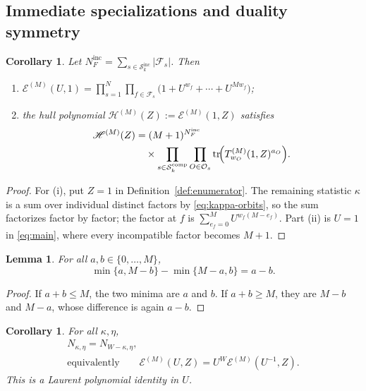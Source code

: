 \documentclass[preprint,12pt,a4paper]{elsarticle}
\newcommand{\Fs}{\mathcal F_s}
\newcommand{\Os}{\mathcal O_s}
\newcommand{\Epoly}{\mathscr E}
\newtheorem{lemma}[theorem]{Lemma}
\newtheorem{corollary}[theorem]{Corollary}
\theoremstyle{definition}
\theoremstyle{remark}
\begin{document}
\subsection{Immediate specializations and duality symmetry}
\label{sec:specialisations}

\begin{corollary}\label{cor:marginals}
Let $N_F^{\mathrm{inc}}=\sum_{s\in\mathcal{S}_k^{\mathrm{inc}}}|\Fs|$.  Then
\begin{enumerate}
\item[\textup{(i)}]
$\displaystyle
\Epoly^{(M)}(U,1)
 =\prod_{s=1}^{N}\prod_{f\in\Fs}
   \bigl(1+U^{w_f}+\cdots+U^{Mw_f}\bigr)$;
\item[\textup{(ii)}] the hull polynomial
$\mathscr{H}^{(M)}(Z):=\Epoly^{(M)}(1,Z)$ satisfies
\[
\begin{aligned}
\mathscr{H}^{(M)}(Z)
&=(M+1)^{N_F^{\mathrm{inc}}}\\
&\quad\times
\prod_{s\in\mathcal{S}_k^{\mathrm{comp}}}
\prod_{O\in\Os}
\operatorname{tr}\!\Bigl(
T^{(M)}_{w_O}(1,Z)^{a_O}
\Bigr).
\end{aligned}
\]
\end{enumerate}
\end{corollary}

\begin{proof}
For (i), put $Z=1$ in Definition~\ref{def:enumerator}.  The remaining statistic
$\kappa$ is a sum over individual distinct factors by
\eqref{eq:kappa-orbits}, so the sum factorizes factor by factor; the factor at
$f$ is $\sum_{e_f=0}^{M}U^{w_f(M-e_f)}$.  Part (ii) is $U=1$ in
\eqref{eq:main}, where every incompatible factor becomes $M+1$.
\end{proof}

\begin{lemma}\label{lem:telescoping}
For all $a,b\in\{0,\ldots,M\}$,
\[
\min\{a,M-b\}-\min\{M-a,b\}=a-b.
\]
\end{lemma}

\begin{proof}
If $a+b\leq M$, the two minima are $a$ and $b$.  If $a+b\geq M$, they are
$M-b$ and $M-a$, whose difference is again $a-b$.
\end{proof}

\begin{corollary}\label{cor:symmetry}
For all $\kappa,\eta$,
\[
\begin{gathered}
N_{\kappa,\eta}=N_{W-\kappa,\eta},\\[5pt]
\text{equivalently}\qquad
\Epoly^{(M)}(U,Z)
=U^W\Epoly^{(M)}(U^{-1},Z).
\end{gathered}
\]
This is a Laurent polynomial identity in $U$.
\end{corollary}
\end{document}
